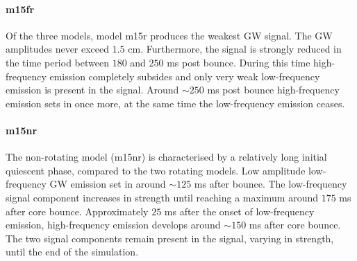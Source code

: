 \paragraph{m15fr}
Of the three models, model m15r produces the weakest GW signal. The GW amplitudes
never exceed $1.5$ cm. Furthermore, the signal is strongly reduced in the
time period between $180$ and $250$ ms post bounce. During this time high-frequency emission
completely subsides and only very weak low-frequency emission is present in the signal.
Around $\sim 250$ ms post bounce high-frequency emission sets in once more, 
at the same time the low-frequency emission ceases. 

\paragraph{m15nr}
The non-rotating model (m15nr) is characterised by a relatively long initial quiescent phase, compared to the two
rotating models. Low amplitude low-frequency GW emission set in around $\sim 125$ ms after bounce. The low-frequency
signal component increases in strength until reaching a maximum around $175$ ms after core bounce.
Approximately $25$ ms after the onset of low-frequency emission, high-frequency emission develops around
$\sim 150$ ms after core bounce. The two signal components remain present in the signal, varying in
strength, until the end of the simulation.

